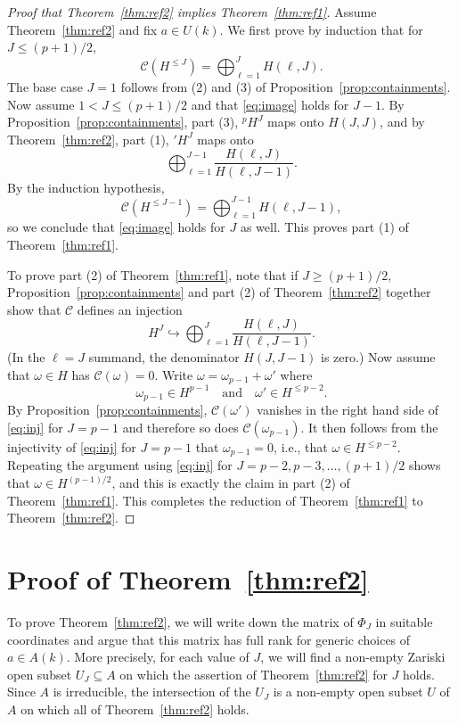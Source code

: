 \documentclass[12pt,reqno]{amsart}
\numberwithin{equation}{section}
\theoremstyle{plain}
\theoremstyle{definition}
\theoremstyle{remark}
\numberwithin{equation}{section}
\newcommand{\CC}{\mathcal{C}}
\newcommand{\<}{\langle}
\renewcommand{\>}{\rangle}
\newcommand{\into}{\hookrightarrow}
\renewcommand{\and}{\quad\text{and}\quad}
\def\pH{{}^pH^J}
\begin{document}
  \begin{proof}[Proof that Theorem~\ref{thm:ref2} implies
    Theorem~\ref{thm:ref1}]
    Assume Theorem~\ref{thm:ref2} and fix $a\in U(k)$.  We first prove by
    induction that for $J\le(p+1)/2$, 
    \begin{equation}\label{eq:image}
    \CC\left(H^{\le J}\right)=\bigoplus_{\ell=1}^{J} H(\ell,J).      
    \end{equation}
    The base case $J=1$ follows from (2) and (3) of
    Proposition~\ref{prop:containments}.  Now assume $1<J\le(p+1)/2$ and that
    \eqref{eq:image} holds for $J-1$.  By
    Proposition~\ref{prop:containments}, part (3), $\pH$ maps onto $H(J,J)$,
    and by Theorem~\ref{thm:ref2}, part (1), ${}'H^{J}$ maps onto
    \[\bigoplus_{\ell=1}^{J-1} \frac{H(\ell,J)}{H(\ell,J-1)}.\]
  By the induction hypothesis,
\[  \CC\left(H^{\le J-1}\right)=\bigoplus_{\ell=1}^{J-1} H(\ell,J-1),\]
  so we conclude that \eqref{eq:image} holds for $J$ as well.  This
  proves  part (1) of Theorem~\ref{thm:ref1}.
  
  To prove part (2) of Theorem~\ref{thm:ref1}, note that if
  $J\ge(p+1)/2$, 
  Proposition~\ref{prop:containments} and part (2) of
  Theorem~\ref{thm:ref2} together show that $\CC$ defines an injection
  \begin{equation}\label{eq:inj}
  H^{J}\into\bigoplus_{\ell=1}^{J}
    \frac{H(\ell,J)}{H(\ell,J-1)}.
  \end{equation}
  (In the $\ell=J$ summand,
  the denominator $H(J,J-1)$ is zero.)  Now assume that $\omega\in H$
  has $\CC(\omega)=0$.  Write $\omega=\omega_{p-1}+\omega'$ where
    \[\omega_{p-1}\in H^{p-1}\and \omega'\in H^{\le p-2}.\]
    By Proposition~\ref{prop:containments}, $\CC(\omega')$ vanishes in
    the right hand side of \eqref{eq:inj} for $J=p-1$ and therefore
    so does $\CC(\omega_{p-1})$.  It then follows from the injectivity
    of \eqref{eq:inj} for $J=p-1$
    that $\omega_{p-1}=0$, i.e., that
    $\omega\in H^{\le p-2}$.  Repeating the argument using
    \eqref{eq:inj} for $J=p-2, p-3,\dots,(p+1)/2$
    shows that $\omega\in H^{(p-1)/2}$, and this is exactly the claim
    in part (2) of Theorem~\ref{thm:ref1}.  This completes the
    reduction of Theorem~\ref{thm:ref1} to Theorem~\ref{thm:ref2}.
  \end{proof}

  
\section{Proof of Theorem~\ref{thm:ref2}}
To prove Theorem~\ref{thm:ref2}, we will write down the matrix of
$\Phi_J$ in suitable coordinates and argue that this matrix has full
rank for generic choices of $a\in A(k)$.  More precisely, for each
value of $J$, we will find a non-empty Zariski open subset
$U_J\subseteq A$ on which the assertion of Theorem~\ref{thm:ref2} for
$J$ holds.  Since $A$ is irreducible, the intersection of the $U_J$ is
a non-empty open subset $U$ of $A$ on which all of
Theorem~\ref{thm:ref2} holds.
\end{document}
